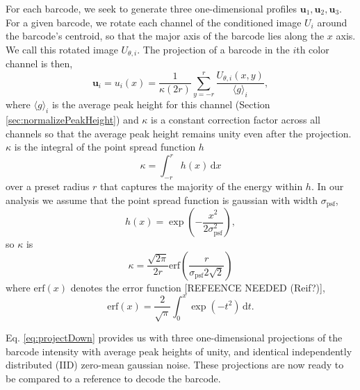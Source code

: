  For each barcode, we seek to generate three one-dimensional profiles $\mathbf{u}_1, \mathbf{u}_2, \mathbf{u}_3$. For a given barcode, we rotate each channel of the  conditioned image $U_i$ around the barcode's centroid, so that the major axis of the barcode lies along the $x$ axis. We call this rotated image  $U_{\theta,i}$. The projection of a barcode in the $i$th color channel is then, 
\begin{equation}\label{eq:projectDown}
	   \mathbf{u}_i=u_i(x)=\frac{1}{\kappa (2r)}  \sum_{y=-r}^r{ \frac {U_{\theta,i}(x,y)}{\langle g \rangle_i}  },
\end{equation}
where $\langle g \rangle_i$ is the average peak height for this channel (Section \ref{sec:normalizePeakHeight}) and $\kappa$ is a constant correction factor across all channels so that the average peak height remains unity even after the projection. $\kappa$ is the integral of the point spread function $h$ 
\begin{equation}
	\kappa=\int_{-r}^{r} h(x) \, \mathrm{d}x
\end{equation}
over a preset radius $r$ that captures the majority of the energy within $h$. In our analysis we assume that the point spread function is gaussian with width $\sigma_{\text{psf}}$,
\begin{equation}\label{eq:psf}
h(x)=\exp \left(  -\frac{x^2}{2\sigma_{\text{psf}}^2} \right),
\end{equation}
so $\kappa$ is
\begin{equation}
\kappa = \frac{\sqrt{2\pi}} {2r} \text{erf} \left(\frac{r}{\sigma_{\text{psf}}2\sqrt{2}} \right)
\end{equation}
where $\text{erf}(x)$ denotes the error function [REFEENCE NEEDED (Reif?)],
\begin{equation}
\text{erf}(x) = \frac{2}{\sqrt{\pi}} \int_0^x \exp (-t^2) \, \mathrm{d}t.
\end{equation}

Eq. \ref{eq:projectDown} provides us with three one-dimensional projections of the barcode intensity with average peak heights of unity, and identical independently distributed (IID) zero-mean gaussian noise. These projections are now ready to be compared to a reference to decode the barcode.


